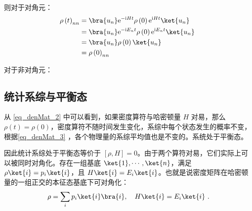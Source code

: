 则对于对角元：
\begin{equation}
\begin{aligned}
\rho\left( t \right)_{nn} &= \bra{u_n}\mathrm{e}^{-\mathrm{i}H t}\rho\left( 0 \right)\mathrm{e}^{\mathrm{i}Ht}\ket{u_n} \\
&=\bra{u_n}\mathrm{e}^{-\mathrm{i}E_n t}\rho\left( 0 \right)\mathrm{e}^{\mathrm{i}E_nt}\ket{u_n} \\
&=\bra{u_n}\rho\left( 0 \right)\ket{u_n} \\
&=\rho\left( 0 \right)_{nn}
\end{aligned}~
\end{equation}

对于非对角元：







\subsection{统计系综与平衡态}
从 \autoref{eq_denMat_2} 中可以看到，如果密度算符与哈密顿量 $H$ 对易，那么 $\rho(t)=\rho(0)$，密度算符不随时间发生变化，系综中每个状态发生的概率不变，根据\autoref{eq_denMat_3} ，各个物理量的系综平均值也是不变的。系统处于平衡态。

因此统计系综处于平衡态等价于 $[\rho,H]=0$。由于两个算符对易，它们实际上可以被同时对角化。存在一组基底 $\ket{1},\cdots,\ket{n}$，满足 $\rho \ket{i} = p_i \ket{i}$，且 $H\ket{i}=E_i \ket{i}$。也就是说密度矩阵在哈密顿量的一组正交的本征态基底下可对角化：
\begin{equation}
\rho = \sum_i p_i \ket{i}\bra{i},\quad H\ket{i}=E_i \ket{i}~.
\end{equation}

